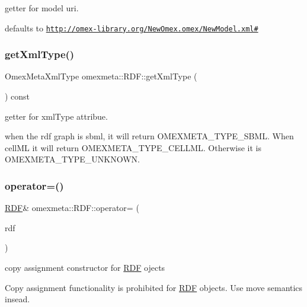 getter for model uri. 

defaults to \href{http://omex-library.org/NewOmex.omex/NewModel.xml#}{\tt http\+://omex-\/library.\+org/\+New\+Omex.\+omex/\+New\+Model.\+xml\#} \mbox{\label{classomexmeta_1_1RDF_a6979e6ca2688cf5cae1e9e1cf3a7309a}} 
\subsubsection{\texorpdfstring{get\+Xml\+Type()}{getXmlType()}}
{\footnotesize\ttfamily Omex\+Meta\+Xml\+Type omexmeta\+::\+R\+D\+F\+::get\+Xml\+Type (\begin{DoxyParamCaption}{ }\end{DoxyParamCaption}) const}



getter for xml\+Type attribue. 

when the rdf graph is sbml, it will return O\+M\+E\+X\+M\+E\+T\+A\+\_\+\+T\+Y\+P\+E\+\_\+\+S\+B\+ML. When cell\+ML it will return O\+M\+E\+X\+M\+E\+T\+A\+\_\+\+T\+Y\+P\+E\+\_\+\+C\+E\+L\+L\+ML. Otherwise it is O\+M\+E\+X\+M\+E\+T\+A\+\_\+\+T\+Y\+P\+E\+\_\+\+U\+N\+K\+N\+O\+WN. \mbox{\label{classomexmeta_1_1RDF_a9d1b20d798969d3c1dac412c621247b9}} 
\subsubsection{\texorpdfstring{operator=()}{operator=()}}
{\footnotesize\ttfamily \hyperlink{classomexmeta_1_1RDF}{R\+DF}\& omexmeta\+::\+R\+D\+F\+::operator= (\begin{DoxyParamCaption}\item[{const \hyperlink{classomexmeta_1_1RDF}{R\+DF} \&}]{rdf }\end{DoxyParamCaption})\hspace{0.3cm}{\ttfamily [delete]}}



copy assignment constructor for \hyperlink{classomexmeta_1_1RDF}{R\+DF} ojects 

Copy assignment functionality is prohibited for \hyperlink{classomexmeta_1_1RDF}{R\+DF} objects. Use move semantics insead. \mbox{\label{classomexmeta_1_1RDF_af5f598560ab2a4ebe661f9bdb8665755}} 
